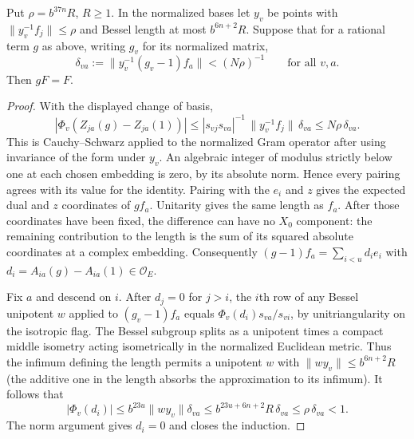\begin{lemma}\label{moment:fixed-frame}
Put $\rho=b^{37n}R$, $R\ge1$. In the normalized bases let $y_v$ be
points with $\|y_v^{-1}f_j\|\le\rho$ and Bessel length at most
$b^{6n+2}R$. Suppose that for a rational term $g$ as above, writing
$g_v$ for its normalized matrix,
\[
 \delta_{va}:=\|y_v^{-1}(g_v-1)f_a\|<(N\rho)^{-1}
 \qquad\text{for all }v,a.
\]
Then $gF=F$.
\end{lemma}
\begin{proof}
With the displayed change of basis,
\[
 |\Phi_v(Z_{ja}(g)-Z_{ja}(1))|
 \le |s_{vj}s_{va}|^{-1}\,\|y_v^{-1}f_j\|\,\delta_{va}
 \le N\rho\,\delta_{va}.
\]
This is Cauchy--Schwarz applied to the normalized Gram operator after
using invariance of the form under $y_v$. An algebraic integer of
modulus strictly below one at each chosen embedding is zero, by its
absolute norm. Hence every pairing agrees with its value for the identity.
Pairing with the $e_i$ and $z$ gives the expected dual and $z$
coordinates of $g f_a$. Unitarity gives the same length as $f_a$.
After those coordinates have been fixed, the difference can have no
$X_0$ component: the remaining contribution to the length is the sum
of its squared absolute coordinates at a complex embedding. Consequently
$(g-1)f_a=\sum_{i<u}d_i e_i$ with $d_i=A_{ia}(g)-A_{ia}(1)\in\mathcal O_E$.

Fix $a$ and descend on $i$. After $d_j=0$ for $j>i$, the $i$th row of
any Bessel unipotent $w$ applied to $(g_v-1)f_a$ equals
$\Phi_v(d_i)s_{va}/s_{vi}$, by unitriangularity on the isotropic flag.
The Bessel subgroup splits as a unipotent times a compact middle
isometry acting isometrically in the normalized Euclidean metric.
Thus the infimum defining the length permits a unipotent $w$ with
$\|w y_v\|\le b^{6n+2}R$ (the additive one in the length absorbs
the approximation to its infimum). It follows that
\[
 |\Phi_v(d_i)|\le b^{23u}\|w y_v\|\delta_{va}
 \le b^{23u+6n+2}R\,\delta_{va}\le\rho\,\delta_{va}<1 .
\]
The norm argument gives $d_i=0$ and closes the induction.
\end{proof}

